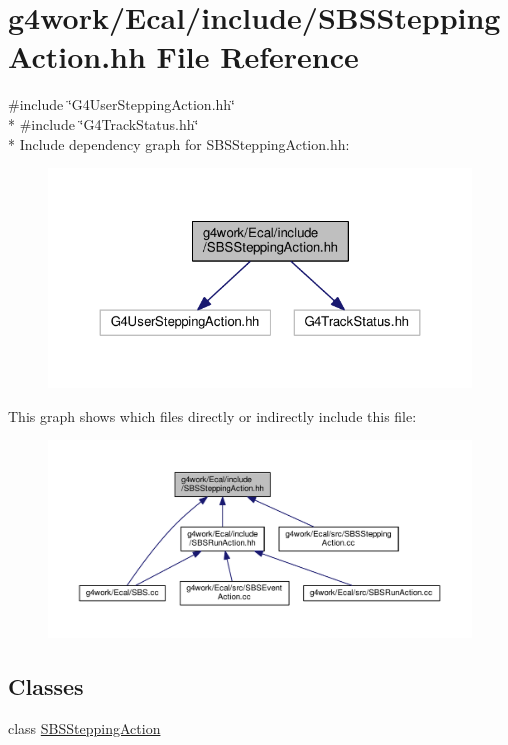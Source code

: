 \hypertarget{_s_b_s_stepping_action_8hh}{\section{g4work/\-Ecal/include/\-S\-B\-S\-Stepping\-Action.hh File Reference}
\label{_s_b_s_stepping_action_8hh}
}
{\ttfamily \#include \char`\"{}G4\-User\-Stepping\-Action.\-hh\char`\"{}}\\*
{\ttfamily \#include \char`\"{}G4\-Track\-Status.\-hh\char`\"{}}\\*
Include dependency graph for S\-B\-S\-Stepping\-Action.\-hh\-:\nopagebreak
\begin{figure}[H]
\begin{center}
\leavevmode
\includegraphics[width=324pt]{_s_b_s_stepping_action_8hh__incl}
\end{center}
\end{figure}
This graph shows which files directly or indirectly include this file\-:\nopagebreak
\begin{figure}[H]
\begin{center}
\leavevmode
\includegraphics[width=350pt]{_s_b_s_stepping_action_8hh__dep__incl}
\end{center}
\end{figure}
\subsection*{Classes}
\begin{DoxyCompactItemize}
\item 
class \hyperlink{class_s_b_s_stepping_action}{S\-B\-S\-Stepping\-Action}
\end{DoxyCompactItemize}
